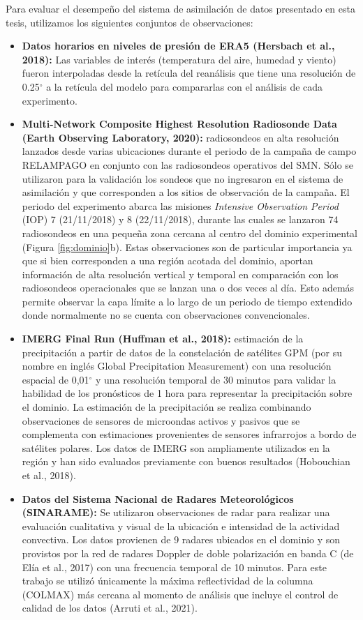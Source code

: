 \documentclass[12pt,oneside,a4paper]{reedthesis}
\begin{document}
Para evaluar el desempeño del sistema de asimilación de datos presentado en esta tesis, utilizamos los siguientes conjuntos de observaciones:
\begin{itemize}
\item
  \textbf{Datos horarios en niveles de presión de ERA5 (Hersbach et al., 2018):} Las variables de interés (temperatura del aire, humedad y viento) fueron interpoladas desde la retícula del reanálisis que tiene una resolución de 0.25\(^{\circ}\) a la retícula del modelo para compararlas con el análisis de cada experimento.
\item
  \textbf{Multi-Network Composite Highest Resolution Radiosonde Data (Earth Observing Laboratory, 2020):} radiosondeos en alta resolución lanzados desde varias ubicaciones durante el periodo de la campaña de campo RELAMPAGO en conjunto con las radiosondeos operativos del SMN. Sólo se utilizaron para la validación los sondeos que no ingresaron en el sistema de asimilación y que corresponden a los sitios de observación de la campaña. El periodo del experimento abarca las misiones \emph{Intensive Observation Period} (IOP) 7 (21/11/2018) y 8 (22/11/2018), durante las cuales se lanzaron 74 radiosondeos en una pequeña zona cercana al centro del dominio experimental (Figura \ref{fig:dominio}b). Estas observaciones son de particular importancia ya que si bien corresponden a una región acotada del dominio, aportan información de alta resolución vertical y temporal en comparación con los radiosondeos operacionales que se lanzan una o dos veces al día. Esto además permite observar la capa límite a lo largo de un periodo de tiempo extendido donde normalmente no se cuenta con observaciones convencionales.
\item
  \textbf{IMERG Final Run (Huffman et al., 2018):} estimación de la precipitación a partir de datos de la constelación de satélites GPM (por su nombre en inglés Global Precipitation Measurement) con una resolución espacial de 0,01\(^{\circ}\) y una resolución temporal de 30 minutos para validar la habilidad de los pronósticos de 1 hora para representar la precipitación sobre el dominio. La estimación de la precipitación se realiza combinando observaciones de sensores de microondas activos y pasivos que se complementa con estimaciones provenientes de sensores infrarrojos a bordo de satélites polares. Los datos de IMERG son ampliamente utilizados en la región y han sido evaluados previamente con buenos resultados (Hobouchian et al., 2018).
\item
  \textbf{Datos del Sistema Nacional de Radares Meteorológicos (SINARAME):} Se utilizaron observaciones de radar para realizar una evaluación cualitativa y visual de la ubicación e intensidad de la actividad convectiva. Los datos provienen de 9 radares ubicados en el dominio y son provistos por la red de radares Doppler de doble polarización en banda C (de Elía et al., 2017) con una frecuencia temporal de 10 minutos. Para este trabajo se utilizó únicamente la máxima reflectividad de la columna (COLMAX) más cercana al momento de análisis que incluye el control de calidad de los datos (Arruti et al., 2021).

\end{itemize}
\end{document}
